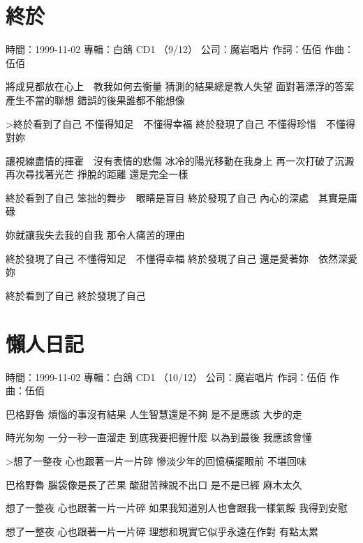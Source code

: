 \documentclass[UTF8,a4paper,oneside,twocolumn,12pt]{ctexbook}
\newcommand{\infopair}[2]{\textbullet #1：#2}
\newcommand{\zc}[1][伍佰]{\infopair{作詞}{#1}}
\newcommand{\zq}[1][伍佰]{\infopair{作曲}{#1}}
\newcommand{\zj}[1]{\infopair{專輯}{#1}}
\newcommand{\sj}[1]{\infopair{時間}{#1}}
\newcommand{\gs}[1]{\infopair{公司}{#1}}
\newenvironment{info}{\begin{flushleft}\kaishu
	}
	{\end{flushleft}\normalsize\yahei\par}
\newenvironment{lyric}{
	}
{}
\begin{document}
\section{終於}
\begin{info}
	\sj{1999-11-02}
	\zj{白鴿 CD1 （9/12）}
	\gs{魔岩唱片}
	\zc
	\zq
\end{info}
\begin{lyric}
	將成見都放在心上　教我如何去衡量
	猜測的結果總是教人失望
	面對著漂浮的答案　產生不當的聯想
	錯誤的後果誰都不能想像

	>終於看到了自己
	不懂得知足　不懂得幸福
	終於發現了自己
	不懂得珍惜　不懂得對妳

	讓視線盡情的揮霍　沒有表情的悲傷
	冰冷的陽光移動在我身上
	再一次打破了沉澱　再次尋找著光芒
	掙脫的距離  還是完全一樣

	終於看到了自己
	笨拙的舞步　眼睛是盲目
	終於發現了自己
	內心的深處　其實是庸碌

	妳就讓我失去我的自我
	那令人痛苦的理由

	終於發現了自己
	不懂得知足　不懂得幸福
	終於發現了自己
	還是愛著妳　依然深愛妳

	終於看到了自己
	終於發現了自己
\end{lyric}

\section{懶人日記}
\begin{info}
	\sj{1999-11-02}
	\zj{白鴿 CD1 （10/12）}
	\gs{魔岩唱片}
	\zc
	\zq
\end{info}
\begin{lyric}
	巴格野魯 煩惱的事沒有結果 人生智慧還是不夠
	是不是應該 大步的走

	時光匆匆 一分一秒一直溜走 到底我要把握什麼
	以為到最後 我應該會懂

	>想了一整夜 心也跟著一片一片碎
	慘淡少年的回憶橫擺眼前 不堪回味

	巴格野魯 腦袋像是長了芒果 酸甜苦辣說不出口
	是不是已經 麻木太久

	想了一整夜 心也跟著一片一片碎
	如果我知道別人也會跟我一樣氣餒
	我得到安慰

	想了一整夜 心也跟著一片一片碎
	理想和現實它似乎永遠在作對 有點太累
\end{lyric}
\end{document}
